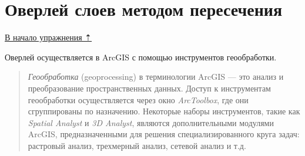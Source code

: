 \documentclass[12pt,]{book}
\begin{document}
\hypertarget{overlay-intersect}{%
\section{Оверлей слоев методом пересечения}\label{overlay-intersect}}

\protect\hyperlink{overlay}{В начало упражнения ⇡}

Оверлей осуществляется в ArcGIS с помощью инструментов геообработки.

\begin{quote}
\emph{Геообработка} (geoprocessing) в терминологии ArcGIS --- это анализ и преобразование пространственных данных. Доступ к инструментам геообработки осуществляется через окно \emph{ArcToolbox}, где они сгруппированы по назначению. Некоторые наборы инструментов, такие как \emph{Spatial Analyst} и \emph{3D Analyst}, являются дополнительными модулями ArcGIS, предназначенными для решения специализированного круга задач: растровый анализ, трехмерный анализ, сетевой анализ и т.д.
\end{quote}
\end{document}
